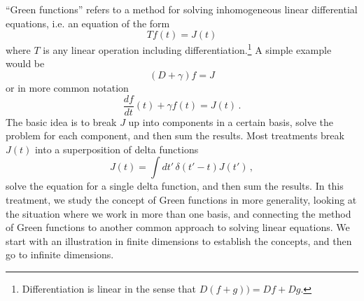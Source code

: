 
``Green functions'' refers to a method for solving inhomogeneous linear differential equations, i.e. an equation of the form
\begin{equation}
  Tf(t) = J(t)
\end{equation}
where $T$ is any linear operation including differentiation.\footnote{Differentiation is linear in the sense that $D (f + g)) = Df + Dg$.}
A simple example would be
\begin{equation}
  \left(D + \gamma \right) f = J
\end{equation}
or in more common notation
\begin{equation}
  \frac{df}{dt}(t) + \gamma f(t) = J(t) \, .
\end{equation}
The basic idea is to break $J$ up into components in a certain basis, solve the problem for each component, and then sum the results.
Most treatments break $J(t)$ into a superposition of delta functions
\begin{equation}
  J(t) = \int dt' \, \delta(t' - t) J(t') \, ,
\end{equation}
solve the equation for a single delta function, and then sum the results.
In this treatment, we study the concept of Green functions in more generality, looking at the situation where we work in more than one basis, and connecting the method of Green functions to another common approach to solving linear equations.
We start with an illustration in finite dimensions to establish the concepts, and then go to infinite dimensions.
